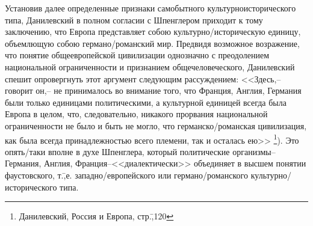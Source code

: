 Установив далее определенные признаки самобытного культурноисторического типа, Данилевский в полном согласии с Шпенглером приходит к тому заключению, что Европа представляет собою культурно\-/историческую единицу, объемлющую собою германо\-/романский мир. Предвидя возможное возражение, что понятие общеевропейской цивилизации однозначно с преодолением национальной ограниченности и признанием общечеловеческого, Данилевский спешит опровергнуть этот аргумент следующим рассуждением: <<Здесь,\---говорит он,\--- не принималось во внимание того, что Франция, Англия, Германия были только единицами политическими, а культурной единицей всегда была Европа в целом, что, следовательно, никакого прорвания национальной ограниченности не было и быть не могло, что германско\-/романская цивилизация, как была всегда принадлежностью всего племени, так и осталась ею>> \footnote{Данилевский, Россия и Европа, стр.\=,120}). Это опять\-/таки вполне в духе Шпенглера, который политические организмы\---Германия, Англия, Франция\---<<диалектически>> объединяет в высшем понятии фаустовского, т.\=,е. западно\-/европейского или германо\-/романского культурно\-/исторического типа.

